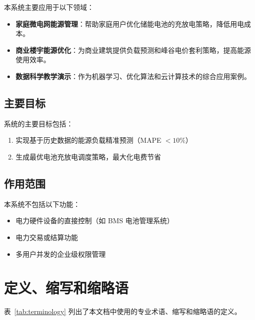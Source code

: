 本系统主要应用于以下领域：

\begin{itemize}
    \item \textbf{家庭微电网能源管理}：帮助家庭用户优化储能电池的充放电策略，降低用电成本。
    \item \textbf{商业楼宇能源优化}：为商业建筑提供负载预测和峰谷电价套利策略，提高能源使用效率。
    \item \textbf{数据科学教学演示}：作为机器学习、优化算法和云计算技术的综合应用案例。
\end{itemize}

\subsection{主要目标}

系统的主要目标包括：

\begin{enumerate}
    \item 实现基于历史数据的能源负载精准预测（MAPE $< 10\%$）
    \item 生成最优电池充放电调度策略，最大化电费节省
\end{enumerate}

\subsection{作用范围}

本系统不包括以下功能：

\begin{itemize}
    \item 电力硬件设备的直接控制（如 BMS 电池管理系统）
    \item 电力交易或结算功能
    \item 多用户并发的企业级权限管理
\end{itemize}

\section{定义、缩写和缩略语}

表~\ref{tab:terminology} 列出了本文档中使用的专业术语、缩写和缩略语的定义。

